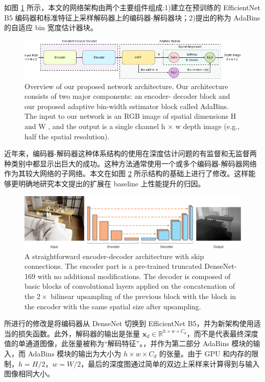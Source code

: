 \documentclass{vip-theme}
\begin{document}
 如图 \ref{fig:model} 所示，本文的网络架构由两个主要组件组成:1)建立在预训练的 EfficientNet B5 编码器和标准特征上采样解码器上的编码器-解码器块；2)提出的称为 AdaBins 的自适应 bin 宽度估计器块。
 

\begin{figure}[!htbp]
\centering
	\includegraphics[width=.7\paperwidth]{figure/model}
	\caption{Overview of our proposed network architecture. Our architecture consists of two major components: an encoder- decoder block and our proposed adaptive bin-width estimator block called AdaBins. The input to our network is an RGB image of spatial dimensions H and W , and the output is a single channel h × w depth image (e.g., half the spatial resolution).}
	\label{fig:model}
\end{figure}

近年来，编码器-解码器这种体系结构的使用在深度估计问题的有监督和无监督两种类别中都显示出巨大的成功。这种方法通常使用一个或多个编码器-解码器网络作为其较大网络的子网络。本文在如图 \ref{fig:model2} 所示结构的基础上进行了修改。这样能够更明确地研究本文提出的扩展在 baseline 上性能提升的归因。

\begin{figure}[!htbp]
\centering
	\includegraphics[width=.7\paperwidth]{figure/network_overview}
	\caption{A straightforward encoder-decoder architecture with skip connections. The encoder part is a pre-trained truncated DenseNet-169 with no additional modifications. The decoder is composed of basic blocks of convolutional layers applied on the concatenation of the $2\times$ bilinear upsampling of the previous block with the block in the encoder with the same spatial size after upsampling. }
	\label{fig:model2}
\end{figure}

所进行的修改是将编码器从 DenseNet 切换到 EfficientNet B5，并为新架构使用适当的损失函数。此外，解码器的输出是张量 $\textbf{x}_d \in \mathbb{R}^{h \times w \times C_d}$，而不是代表最终深度值的单通道图像，此张量被称为“解码特征”。，并作为第二部分 AdaBins 模块的输入，而 AdaBins 模块的输出为大小为 $h \times w \times C_d$ 的张量。由于 GPU 和内存的限制，$h=H/2$，$w=W/2$，最后的深度图通过简单的双边上采样来计算得到与输入图像相同大小。
\end{document}
